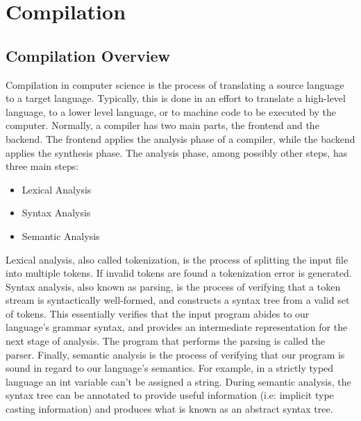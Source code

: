 \section{Compilation}
\subsection{Compilation Overview}
Compilation in computer science is the process of translating a source language
to a target language. Typically, this is done in an effort to translate a
high-level language, to a lower level language, or to machine code to be executed by
the computer. Normally, a compiler has two main parts, the frontend and the backend.
The frontend applies the analysis phase of a compiler, while the backend applies
the synthesis phase. The analysis phase, among possibly other steps, has three
main steps:
\begin{itemize}
  \item Lexical Analysis
  \item Syntax Analysis
  \item Semantic Analysis
\end{itemize}
Lexical analysis, also called tokenization, is the process of splitting the
input file into multiple tokens. If invalid tokens are found a tokenization
error is generated. Syntax analysis, also known as parsing, is the process of
verifying that a token stream is syntactically well-formed, and constructs a
syntax tree from a valid set of tokens. This essentially verifies that the input program
abides to our language's grammar syntax, and provides an intermediate
representation for the next stage of analysis. The program that performs the
parsing is called the parser. Finally, semantic analysis is the process of
verifying that our program is sound in regard to our language's semantics. For
example, in a strictly typed language an int variable can't be assigned a
string. During semantic analysis, the syntax tree can be annotated to provide
useful information (i.e: implicit type casting information) and produces what is
known as an abstract syntax tree.

